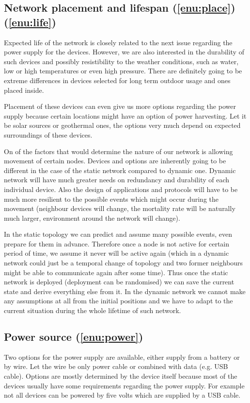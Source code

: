 \documentclass[
  print, %
  table,   %
  nolof,     %
  nolot,     %
           oneside
]{fithesis3}
\begin{document}
  \subsection{Network placement and lifespan (\ref{enu:place}) (\ref{enu:life})}
  Expected life of the network is closely related to the next issue regarding the power supply for the devices. However, we are also interested in the durability of such devices and possibly resistibility to the weather conditions, such as water, low or high temperatures or even high pressure. There are definitely going to be extreme differences in devices selected for long term outdoor usage and ones placed inside.

  Placement of these devices can even give us more options regarding the power supply because certain locations might have an option of power harvesting. Let it be solar sources or geothermal ones, the options very much depend on expected surroundings of these devices.

  On of the factors that would determine the nature of our network is allowing movement of certain nodes. Devices and options are inherently going to be different in the case of the static network compared to dynamic one. Dynamic network will have much greater needs on redundancy and durability of each individual device. Also the design of applications and protocols will have to be much more resilient to the possible events which might occur during the movement (neighbour devices will change, the mortality rate will be naturally much larger, environment around the network will change).

  In the static topology we can predict and assume many possible events, even prepare for them in advance. Therefore once a node is not active for certain period of time, we assume it never will be active again (which in a dynamic network could just be a temporal change of topology and two former neighbours might be able to communicate again after some time). Thus once the static network is deployed (deployment can be randomised) we can save the current state and derive everything else from it. In the dynamic network we cannot make any assumptions at all from the initial positions and we have to adapt to the current situation during the whole lifetime of such network.

  \subsection{Power source (\ref{enu:power})}
  Two options for the power supply are available, either supply from a battery or by wire. Let the wire be only power cable or combined with data (e.g. USB cable). Options are mostly determined by the device itself because most of the devices usually have some requirements regarding the power supply. For example not all devices can be powered by five volts which are supplied by a USB cable.
\end{document}
